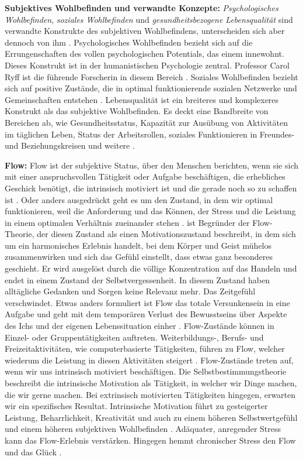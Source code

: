 \par
\textbf{Subjektives Wohlbefinden und verwandte Konzepte:} \textit{Psychologisches Wohlbefinden}, \textit{soziales Wohlbefinden} und \textit{gesundheitsbezogene Lebensqualität} sind verwandte Konstrukte des subjektiven Wohlbefindens, unterscheiden sich aber dennoch von ihm \cite{Carr2011}. Psychologisches Wohlbefinden bezieht sich auf die Errungenschaften des vollen psychologischen Potentials, das einem innewohnt. Dieses Konstrukt ist in der humanistischen Psychologie zentral. Professor Carol Ryff ist die führende Forscherin in diesem Bereich \cite{Ryff1989}. Soziales Wohlbefinden bezieht sich auf positive Zustände, die in optimal funktionierende sozialen Netzwerke und Gemeinschaften entstehen \cite{Keyes1998}. Lebensqualität ist ein breiteres und komplexeres Konstrukt als das subjektive Wohlbefinden. Es deckt eine Bandbreite von Bereichen ab, wie Gesundheitsstatus, Kapazität zur Ausübung von Aktivitäten im täglichen Leben, Status der Arbeitsrollen, soziales Funktionieren in Freundes- und Beziehungskreisen und weitere \cite{Preedy2010}. 
\par
\textbf{Flow:}
Flow ist der subjektive Status, über den Menschen berichten, wenn sie sich mit einer anspruchsvollen Tätigkeit oder Aufgabe beschäftigen, die erhebliches Geschick benötigt, die intrinsisch motiviert ist und die gerade noch so zu schaffen ist \cite{Nakamura2009}. Oder anders ausgedrückt geht es um den Zustand, in dem wir optimal funktionieren, weil die Anforderung und das Können, der Stress und die Leistung in einem optimalen Verhältnis zueinander stehen \cite{Esch2014}.  ist Begründer der Flow-Theorie, der diesen Zustand als einen Motivationszustand beschreibt, in dem sich um ein harmonisches Erlebnis handelt, bei dem Körper und Geist mühelos zusammenwirken und sich das Gefühl einstellt, dass etwas ganz besonderes geschieht. Er wird ausgelöst durch die völlige Konzentration auf das Handeln und endet in einem Zustand der Selbstvergessenheit. In diesem Zustand haben alltägliche Gedanken und Sorgen keine Relevanz mehr. Das Zeitgefühl verschwindet. Etwas anders formuliert ist Flow das totale Versunkensein in eine Aufgabe und geht mit dem temporären Verlust des Bewusstseins über Aspekte des Ichs und der eigenen Lebenssituation einher \cite{Nakamura2009}. Flow-Zustände können in Einzel- oder Gruppentätigkeiten auftreten. Weiterbildungs-, Berufs- und Freizeitaktivitäten, wie computerbasierte Tätigkeiten, führen zu Flow, welcher wiederum die Leistung in diesen Aktivitäten steigert \cite{Carr2011}. Flow-Zustände treten auf, wenn wir uns intrinsisch motiviert beschäftigen. Die Selbstbestimmungstheorie beschreibt die intrinsische Motivation als Tätigkeit, in welcher wir Dinge machen, die wir gerne machen. Bei extrinsisch motivierten Tätigkeiten hingegen, erwarten wir ein spezifisches Resultat. Intrinsische Motivation führt zu gesteigerter Leistung, Beharrlichkeit, Kreativität und auch zu einem höheren Selbstwertgefühl und einem höheren subjektiven Wohlbefinden \cite{Deci1985}. Adäquater, anregender Stress kann das Flow-Erlebnis verstärken. Hingegen hemmt chronischer Stress den Flow und das Glück \cite{Esch2014}.
